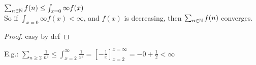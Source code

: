 \begin{property}
	$\sum_{n \in \mathbb{N}} f(n) \leq \int_{x=0}{\infty} f(x)$\\
	So if $\int_{x=0}{\infty} f(x) < \infty$, and $f(x)$ is decreasing, then $\sum_{n \in \mathbb{N}} f(n)$ converges.
\end{property}
\begin{proof}
	easy by def
\end{proof}
E.g.: $\sum_{n \geq 2} \frac{1}{n^2}
\leq \int_{x = 2}^{\infty} \frac{1}{x^2}
= \left[ -\frac{1}{x} \right]_{x=2}^{x=\infty}
= -0 +\frac{1}{2} < \infty$



